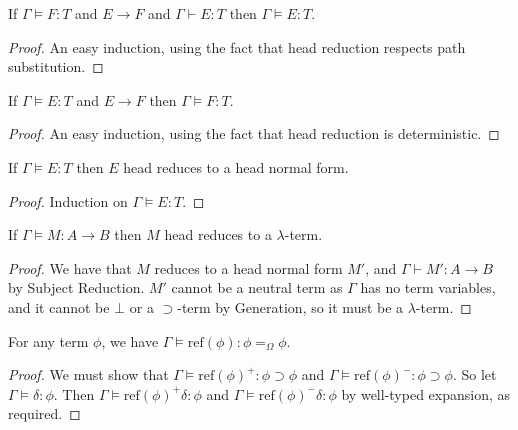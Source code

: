 \documentclass[a4paper,UKenglish]{lipics-v2016}
\newcommand*{\reff}[1]{\ensuremath{\mathrm{ref} \left( {#1} \right)}}
\theoremstyle{plain}
\begin{document}
\begin{lemma}
If $\Gamma \models F : T$ and $E \rightarrow F$ and $\Gamma \vdash E : T$ then $\Gamma \models E : T$.
\end{lemma}

\begin{proof}
An easy induction, using the fact that head reduction respects path substitution.
\end{proof}

\begin{lemma}[Reduction]
If $\Gamma \models E : T$ and $E \rightarrow F$ then $\Gamma \models F : T$.
\end{lemma}

\begin{proof}
An easy induction, using the fact that head reduction is deterministic.
\end{proof}

\begin{lemma}
If $\Gamma \models E : T$ then $E$ head reduces to a head normal form.
\end{lemma}

\begin{proof}
Induction on $\Gamma \models E : T$.
\end{proof}

\begin{lemma}
\label{lm:compute-lambda}
If $\Gamma \models M : A \rightarrow B$ then $M$ head reduces to a $\lambda$-term.
\end{lemma}

\begin{proof}
We have that $M$ reduces to a head normal form $M'$, and $\Gamma \vdash M' : A \rightarrow B$ by Subject Reduction.
$M'$ cannot be a neutral term as $\Gamma$ has no term variables, and it cannot be $\bot$ or a $\supset$-term by Generation,
so it must be a $\lambda$-term.
\end{proof}

\begin{lemma}
\label{lm:ref-compute-Omega}
For any term $\phi$, we have $\Gamma \models \reff{\phi} : \phi =_\Omega \phi$.
\end{lemma}

\begin{proof}
We must show that $\Gamma \models \reff{\phi}^+ : \phi \supset \phi$ and $\Gamma \models \reff{\phi}^- : \phi \supset \phi$.  So let $\Gamma \models \delta : \phi$.
Then $\Gamma \models \reff{\phi}^+ \delta : \phi$ and $\Gamma \models \reff{\phi}^- \delta : \phi$ by well-typed expansion, as required.
\end{proof}
\end{document}
